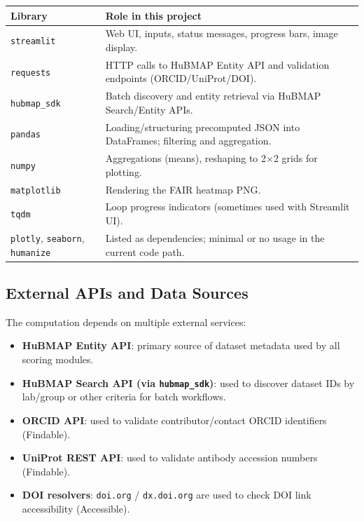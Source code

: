 \documentclass[11pt]{article}
\begin{document}
\begin{center}
\begin{tabular}{@{}p{}p{}@{}}
\toprule
\textbf{Library} & \textbf{Role in this project} \\
\midrule
\texttt{streamlit} & Web UI, inputs, status messages, progress bars, image display. \\
\texttt{requests} & HTTP calls to HuBMAP Entity API and validation endpoints (ORCID/UniProt/DOI). \\
\texttt{hubmap\_sdk} & Batch discovery and entity retrieval via HuBMAP Search/Entity APIs. \\
\texttt{pandas} & Loading/structuring precomputed JSON into DataFrames; filtering and aggregation. \\
\texttt{numpy} & Aggregations (means), reshaping to 2$\times$2 grids for plotting. \\
\texttt{matplotlib} & Rendering the FAIR heatmap PNG. \\
\texttt{tqdm} & Loop progress indicators (sometimes used with Streamlit UI). \\
\texttt{plotly}, \texttt{seaborn}, \texttt{humanize} & Listed as dependencies; minimal or no usage in the current code path. \\
\bottomrule
\end{tabular}
\end{center}

\subsection{External APIs and Data Sources}
The computation depends on multiple external services:
\begin{itemize}[leftmargin=2em]
  \item \textbf{HuBMAP Entity API}: primary source of dataset metadata used by all scoring modules.
  \item \textbf{HuBMAP Search API (via \texttt{hubmap\_sdk})}: used to discover dataset IDs by lab/group or other criteria for batch workflows.
  \item \textbf{ORCID API}: used to validate contributor/contact ORCID identifiers (Findable).
  \item \textbf{UniProt REST API}: used to validate antibody accession numbers (Findable).
  \item \textbf{DOI resolvers}: \texttt{doi.org} / \texttt{dx.doi.org} are used to check DOI link accessibility (Accessible).
\end{itemize}
\end{document}
